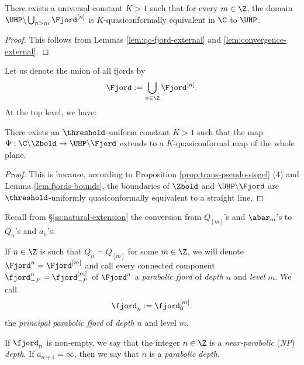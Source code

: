 \documentclass{amsart}
\begin{document}
\begin{lemma}
\label{lem:fjords-bounds}
    There exists a universal constant $K >1$ such that for every $m \in \Z$, the domain $\UHP \backslash \bigcup_{n > m} \Fjord^{[n]}$ is $K$-quasiconformally equivalent in $\C$ to $\UHP$.
\end{lemma}
\begin{proof}
    This follows from Lemmas \ref{lem:qc-fjord-external} and \ref{lem:convergence-external}.
\end{proof}

Let us denote the union of all fjords by
\begin{equation}
    \label{eq:dfn:Fjord}
\Fjord := \bigcup_{n \in \Z} \Fjord^{[n]}.
\end{equation}
At the top level, we have:

\begin{corollary}
\label{cor:Psi-qc}
    There exists an $\threshold$-uniform constant $K>1$ such that the map $\Psi: \C \backslash \hat{\Zbold} \to \UHP \backslash \Fjord$ extends to a $K$-quasiconformal map of the whole plane.
\end{corollary}

\begin{proof}
    This is because, according to Proposition \ref{prop:trans-pseudo-siegel} (4) and Lemma \ref{lem:fjords-bounds}, the boundaries of $\hat{\Zbold}$ and $\UHP \backslash \Fjord$ are $\threshold$-uniformly quasiconformally equivalent to a straight line.
\end{proof}

Recall from \S\ref{ss:natural-extension} the conversion from $Q_{[m]}$'s and $\abar_m$'s to $Q_n$'s and $a_n$'s.

\begin{definition}
\label{def:parabolic-fjord}
    If $n \in \Z$ is such that $Q_{n} = Q_{[m]}$ for some $m \in \Z$, we will denote $\Fjord^n = \Fjord^{[m]}$ and call every connected component $\fjord^n_{-P} = \fjord^{[m]}_{-P}$ of $\Fjord^n$ a \emph{parabolic fjord} of \emph{depth} $n$ and \emph{level} $m$. 
    We call
\[
    \fjord_n := \fjord^{[m]}_0.
\]
    the \emph{principal parabolic fjord} of \emph{depth} $n$ and level $m$.
    
    If $\fjord_n$ is non-empty, we say that the integer $n \in \Z$ is a \emph{near-parabolic} (\emph{NP}) \emph{depth}.
    If $a_{n+1} = \infty$, then we say that $n$ is a \emph{parabolic depth}.
\end{definition}
\end{document}
